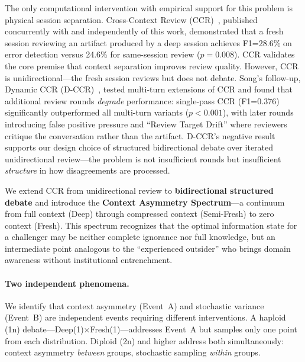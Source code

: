 \documentclass[11pt]{article}
\begin{document}
The only computational intervention with empirical support for this problem is physical session separation. Cross-Context Review (CCR)~\citep{song2026ccr}, published concurrently with and independently of this work, demonstrated that a fresh session reviewing an artifact produced by a deep session achieves F1=28.6\% on error detection versus 24.6\% for same-session review ($p=0.008$). CCR validates the core premise that context separation improves review quality. However, CCR is unidirectional---the fresh session reviews but does not debate. Song's follow-up, Dynamic CCR (D-CCR)~\citep{song2026dccr}, tested multi-turn extensions of CCR and found that additional review rounds \emph{degrade} performance: single-pass CCR (F1=0.376) significantly outperformed all multi-turn variants ($p<0.001$), with later rounds introducing false positive pressure and ``Review Target Drift'' where reviewers critique the conversation rather than the artifact. D-CCR's negative result supports our design choice of structured bidirectional debate over iterated unidirectional review---the problem is not insufficient rounds but insufficient \emph{structure} in how disagreements are processed.

We extend CCR from unidirectional review to \textbf{bidirectional structured debate} and introduce the \textbf{Context Asymmetry Spectrum}---a continuum from full context (Deep) through compressed context (Semi-Fresh) to zero context (Fresh). This spectrum recognizes that the optimal information state for a challenger may be neither complete ignorance nor full knowledge, but an intermediate point analogous to the ``experienced outsider'' who brings domain awareness without institutional entrenchment.

\paragraph{Two independent phenomena.} We identify that context asymmetry (Event~A) and stochastic variance (Event~B) are independent events requiring different interventions. A haploid (1n) debate---Deep(1)$\times$Fresh(1)---addresses Event~A but samples only one point from each distribution. Diploid (2n) and higher address both simultaneously: context asymmetry \emph{between} groups, stochastic sampling \emph{within} groups.
\end{document}
